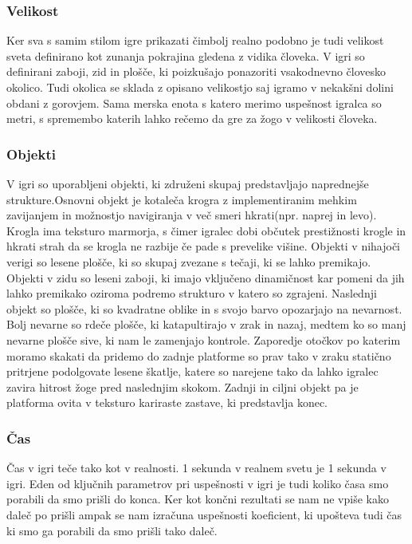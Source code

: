 \documentclass[a4paper]{article}
\begin{document}
\subsubsection{Velikost}
Ker sva s samim stilom igre prikazati čimbolj realno podobno je tudi velikost sveta definirano kot zunanja pokrajina gledena z vidika človeka. V igri so definirani zaboji, zid in plošče, ki poizkušajo ponazoriti vsakodnevno človesko okolico. Tudi okolica se sklada z opisano velikostjo saj igramo v nekakšni dolini obdani z gorovjem. Sama merska enota s katero merimo uspešnost igralca so metri, s spremembo katerih lahko rečemo da gre za žogo v velikosti človeka.
\subsubsection{Objekti}
V igri so uporabljeni objekti, ki združeni skupaj predstavljajo naprednejše strukture.Osnovni objekt je kotaleča krogra z implementiranim mehkim zavijanjem in možnostjo navigiranja v več smeri hkrati(npr. naprej in levo).
Krogla ima teksturo marmorja, s čimer igralec dobi občutek prestižnosti krogle in hkrati strah da se krogla ne razbije če pade s prevelike višine.  Objekti v nihajoči verigi so lesene plošče, ki so skupaj zvezane s tečaji, ki se lahko premikajo. Objekti v zidu so leseni zaboji, ki imajo vključeno dinamičnost kar pomeni da jih lahko premikako oziroma podremo strukturo v katero so zgrajeni. Naslednji objekt so plošče, ki so kvadratne oblike in s svojo barvo opozarjajo na nevarnost. Bolj nevarne so rdeče plošče, ki katapultirajo v zrak in nazaj, medtem ko so manj nevarne plošče sive, ki nam le zamenjajo kontrole. Zaporedje otočkov po katerim moramo skakati da pridemo do zadnje platforme so prav tako v zraku statično pritrjene podolgovate lesene škatlje, katere so narejene tako da lahko igralec zavira hitrost žoge pred naslednjim skokom. Zadnji  in ciljni objekt pa je platforma ovita v teksturo kariraste zastave, ki predstavlja konec.

\subsubsection{Čas}
Čas v igri teče tako kot v realnosti. 1 sekunda v realnem svetu je 1 sekunda v igri. Eden od ključnih parametrov pri uspešnosti v igri je tudi koliko časa smo porabili da smo prišli do konca. Ker kot končni rezultati se nam ne vpiše kako daleč po prišli ampak se nam izračuna uspešnosti koeficient, ki upošteva tudi čas ki smo ga porabili da smo prišli tako daleč.
\end{document}

